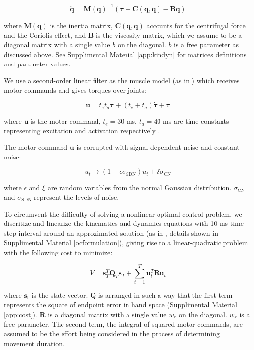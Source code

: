 \begin{equation} \label{maindynamics}
	\ddot{\bm{q}} = \bm{M}(\bm{q})^{-1} (\bm{\tau} - \bm{C}(\bm{q}, \dot{\bm{q}}) - \bm{B}\dot{\bm{q}})
\end{equation}

where $\bm{M}(\bm{q})$ is the inertia matrix, $\bm{C}(\bm{q}, \dot{\bm{q}})$ accounts for the centrifugal force and the Coriolis effect, and $\bm{B}$ is the viscosity matrix, which we assume to be a diagonal matrix with a single value $b$ on the diagonal. $b$ is a free parameter as discussed above. 
See Supplimental Material \ref{app:kindyn} for matrices definitions and parameter values.

We use a second-order linear filter as the muscle model (as in \cite{VanBeers2004}) which receives motor commands and gives torques over joints:

\begin{equation}
	\bm{u} = t_et_a\ddot{\bm{\tau}} + (t_e+t_a)\dot{\bm{\tau}} +\bm{\tau}
\end{equation}

where $\bm{u}$ is the motor command, $t_e = 30$ ms, $t_a = 40$ ms are time constants representing excitation and activation respectively \cite{VanDerHelm}. 

The motor command $\bm{u}$ is corrupted with signal-dependent noise and constant noise:

\begin{equation}\label{cnsdn}
u_t \rightarrow (1 + \epsilon\sigma_{\text{SDN}}) u_t + \xi\sigma_{\text{CN}}
\end{equation}

where $\epsilon$ and $\xi$ are random variables from the normal Gaussian distribution.
$\sigma_{\text{CN}}$ and $\sigma_{\text{SDN}}$ represent the levels of noise.

To circumvent the difficulty of solving a nonlinear optimal control problem, we discritize and linearize the kinematics and dynamics equations with 10 ms time step interval around an approximated solution (as in \cite{Li2004}, details shown in Supplimental Material \ref{ocformulation}), giving rise to a linear-quadratic problem with the following cost to minimize:

\begin{equation}\label{eqn:cost}
V = \bm{s}_T^T\bm{Q}_T\bm{s}_T + \sum_{t=1}^T\bm{u}_t^T\bm{Ru}_t
\end{equation}

where $\bm{s_t}$ is the state vector. 
$\bm{Q}$ is arranged in such a way that the first term represents the square of endpoint error in hand space (Supplimental Material \ref{app:cost}). 
$\bm{R}$ is a diagonal matrix with a single value $w_r$ on the diagonal.
$w_r$ is a free parameter.
The second term, the integral of squared motor commands, are assumed to be the effort being considered in the process of determining movement duration. 

